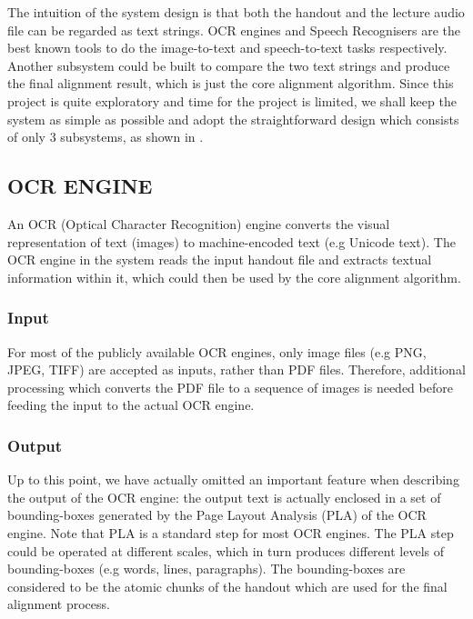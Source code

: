 \documentclass[12pt]{article}
\begin{document}
The intuition of the system design is that both the handout and the lecture audio file can be regarded as text strings. OCR engines and Speech Recognisers are the best known tools to do the image-to-text and speech-to-text tasks respectively. Another subsystem could be built to compare the two text strings and produce the final alignment result, which is just the core alignment algorithm. Since this project is quite exploratory and time for the project is limited, we shall keep the system as simple as possible and adopt the straightforward design which consists of only 3 subsystems, as shown in .

\subsection{OCR ENGINE}

An OCR (Optical Character Recognition) engine converts the visual representation of text (images) to machine-encoded text (e.g Unicode text). The OCR engine in the system reads the input handout file and extracts textual information within it, which could then be used by the core alignment algorithm.

\subsubsection{Input}

For most of the publicly available OCR engines, only image files (e.g PNG, JPEG, TIFF) are accepted as inputs, rather than PDF files. Therefore, additional processing which converts the PDF file to a sequence of images is needed before feeding the input to the actual OCR engine. 

\subsubsection{Output}

Up to this point, we have actually omitted an important feature when describing the output of the OCR engine: the output text is actually enclosed in a set of bounding-boxes generated by the Page Layout Analysis (PLA) of the OCR engine. Note that PLA is a standard step for most OCR engines. The PLA step could be operated at different scales, which in turn produces different levels of bounding-boxes (e.g words, lines, paragraphs). The bounding-boxes are considered to be the atomic chunks of the handout which are used for the final alignment process.
\end{document}
